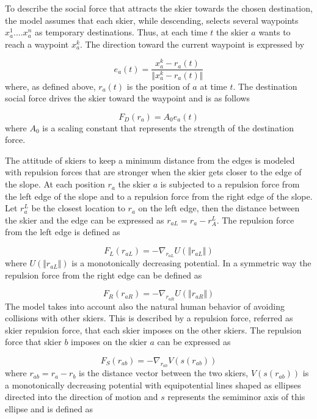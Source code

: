 \documentclass[12pt,a4paper,twoside]{book}
\begin{document}
To describe the social force that attracts the skier towards the chosen destination, the model assumes that each skier, while descending, selects several waypoints $x_a^1....x_a^n$ as temporary destinations. Thus, at each time $t$ the skier $a$ wants to reach a waypoint $x_a^k$. The direction toward the current waypoint is expressed by

\begin{equation}\label{waypoint_direction}
e_a(t)=\frac{x^k_a-r_a(t)}{\Vert x^k_a-r_a(t) \Vert}
\end{equation}
where, as defined above, $r_a(t)$ is the position of $a$ at time $t$. The destination social force drives the skier toward the waypoint and is as follows

\begin{equation}\label{destination_force}
F_D(r_a)=A_0 e_a(t)
\end{equation}
where $A_0$ is a scaling constant that represents the strength of the destination force.

The attitude of skiers to keep a minimum distance from the edges is modeled with repulsion forces that are stronger when the skier gets closer to the edge of the slope. At each position $r_a$ the skier $a$ is subjected to a repulsion force from the left edge of the slope and to a repulsion force from the right edge of the slope. Let $r_a^L$ be the closest location to $r_a$ on the left edge, then the distance between the skier and the edge can be expressed as $r_{aL}=r_a-r_A^L$. The repulsion force from the left edge is defined as

\begin{equation}\label{left_force}
F_L(r_{aL})=-\nabla_{r_{aL}}U(\Vert r_{aL} \Vert )
\end{equation}
where $U(\Vert r_{aL} \Vert )$ is a monotonically decreasing potential. In a symmetric way the repulsion force from the right edge can be defined as

\begin{equation}\label{right_force}
F_R(r_{aR})=-\nabla_{r_{aR}}U(\Vert r_{aR} \Vert )
\end{equation}
The model takes into account also the natural human behavior of avoiding collisions with other skiers. This is described by a repulsion force, referred as skier repulsion force, that each skier imposes on the other skiers. The repulsion force that skier $b$ imposes on the skier $a$ can be expressed as

\begin{equation}\label{skier_force}
F_S(r_{ab})=-\nabla_{r_{ab}}V(s(r_{ab}))
\end{equation}
where $r_{ab}=r_a-r_b$ is the distance vector between the two skiers, $V(s(r_{ab}))$ is a monotonically decreasing potential with equipotential lines shaped as ellipses directed into the direction of motion and $s$ represents the semiminor axis of this ellipse and is defined as
\end{document}
